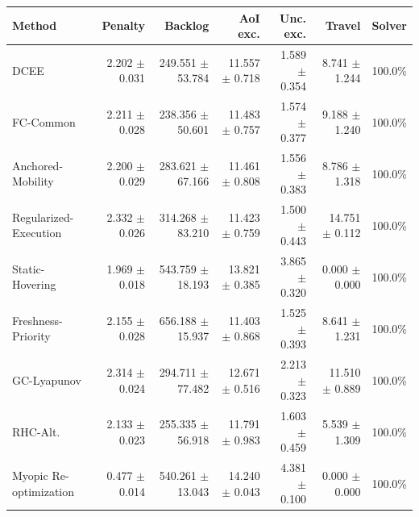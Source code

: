 \begin{tabular}{lrrrrrr}
\toprule
Method & Penalty & Backlog & AoI exc. & Unc. exc. & Travel & Solver \\
\midrule
DCEE & 2.202 $\pm$ 0.031 & 249.551 $\pm$ 53.784 & 11.557 $\pm$ 0.718 & 1.589 $\pm$ 0.354 & 8.741 $\pm$ 1.244 & 100.0\% \\
FC-Common & 2.211 $\pm$ 0.028 & 238.356 $\pm$ 50.601 & 11.483 $\pm$ 0.757 & 1.574 $\pm$ 0.377 & 9.188 $\pm$ 1.240 & 100.0\% \\
Anchored-Mobility & 2.200 $\pm$ 0.029 & 283.621 $\pm$ 67.166 & 11.461 $\pm$ 0.808 & 1.556 $\pm$ 0.383 & 8.786 $\pm$ 1.318 & 100.0\% \\
Regularized-Execution & 2.332 $\pm$ 0.026 & 314.268 $\pm$ 83.210 & 11.423 $\pm$ 0.759 & 1.500 $\pm$ 0.443 & 14.751 $\pm$ 0.112 & 100.0\% \\
Static-Hovering & 1.969 $\pm$ 0.018 & 543.759 $\pm$ 18.193 & 13.821 $\pm$ 0.385 & 3.865 $\pm$ 0.320 & 0.000 $\pm$ 0.000 & 100.0\% \\
Freshness-Priority & 2.155 $\pm$ 0.028 & 656.188 $\pm$ 15.937 & 11.403 $\pm$ 0.868 & 1.525 $\pm$ 0.393 & 8.641 $\pm$ 1.231 & 100.0\% \\
GC-Lyapunov & 2.314 $\pm$ 0.024 & 294.711 $\pm$ 77.482 & 12.671 $\pm$ 0.516 & 2.213 $\pm$ 0.323 & 11.510 $\pm$ 0.889 & 100.0\% \\
RHC-Alt. & 2.133 $\pm$ 0.023 & 255.335 $\pm$ 56.918 & 11.791 $\pm$ 0.983 & 1.603 $\pm$ 0.459 & 5.539 $\pm$ 1.309 & 100.0\% \\
Myopic Re-optimization & 0.477 $\pm$ 0.014 & 540.261 $\pm$ 13.043 & 14.240 $\pm$ 0.043 & 4.381 $\pm$ 0.100 & 0.000 $\pm$ 0.000 & 100.0\% \\
\bottomrule
\end{tabular}
